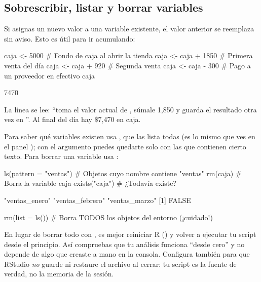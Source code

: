 \subsection{Sobrescribir, listar y borrar variables}

Si asignas un nuevo valor a una variable existente, el valor anterior se
reemplaza sin aviso. Esto es útil para ir acumulando:

\begin{rcode}
caja <- 5000             # Fondo de caja al abrir la tienda
caja <- caja + 1850      # Primera venta del día
caja <- caja + 920       # Segunda venta
caja <- caja - 300       # Pago a un proveedor en efectivo
caja
\end{rcode}
\begin{rsalida}
[1] 7470
\end{rsalida}

La línea  se lee: ``toma el valor actual de
, súmale 1,850 y guarda el resultado otra vez en
''. Al final del día hay \$7,470 en caja.

Para saber qué variables existen usa , que las lista todas
(es lo mismo que ves en el panel ); con el argumento
 puedes quedarte solo con las que contienen cierto texto.
Para borrar una variable usa :

\begin{rcode}
ls(pattern = "ventas")    # Objetos cuyo nombre contiene "ventas"
rm(caja)                  # Borra la variable caja
exists("caja")            # ¿Todavía existe?
\end{rcode}
\begin{rsalida}
[1] "ventas_enero"   "ventas_febrero" "ventas_marzo"  
[1] FALSE
\end{rsalida}

\begin{rnoejecutar}
rm(list = ls())   # Borra TODOS los objetos del entorno (¡cuidado!)
\end{rnoejecutar}

\begin{consejo}
En lugar de borrar todo con , es mejor reiniciar R
() y volver a ejecutar tu script desde el
principio. Así compruebas que tu análisis funciona ``desde cero'' y no
depende de algo que creaste a mano en la consola. Configura también
 para que RStudio \emph{no} guarde ni
restaure el archivo  al cerrar: tu script es la fuente de
verdad, no la memoria de la sesión.
\end{consejo}

